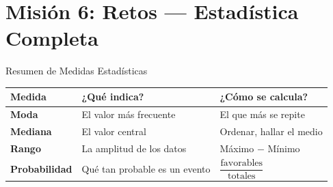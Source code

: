 \documentclass[12pt, letterpaper]{article}
\begin{document}
	\section*{Misión 6: Retos — Estadística Completa}
	
	\begin{concepto}{Resumen de Medidas Estadísticas}
		\vspace{0.2cm}
		\renewcommand{\arraystretch}{1.6}
		\begin{center}
			\begin{tabular}{|m{2.8cm}|m{5cm}|m{4.5cm}|}
				\hline
				\rowcolor{valblue!25}
				\textbf{Medida} & \textbf{¿Qué indica?} & \textbf{¿Cómo se calcula?} \\
				\hline
				\textbf{Moda} &
				El valor más frecuente &
				El que más se repite \\
				\hline
				\textbf{Mediana} &
				El valor central &
				Ordenar, hallar el medio \\
				\hline
				\textbf{Rango} &
				La amplitud de los datos &
				Máximo $-$ Mínimo \\
				\hline
				\textbf{Probabilidad} &
				Qué tan probable es un evento &
				$\dfrac{\text{favorables}}{\text{totales}}$ \\
				\hline
			\end{tabular}
		\end{center}
	\end{concepto}
	
\end{document}
